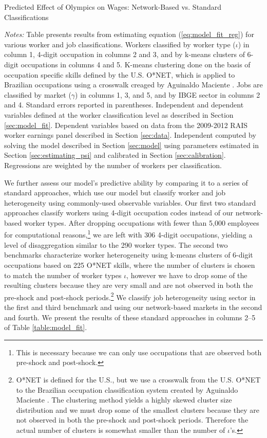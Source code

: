 \documentclass[12pt]{article}
\def\g{\gamma}
\def\i{\iota}
\theoremstyle{definition}
\theoremstyle{plain}
\begin{document}
\begin{table}[h!] \centering
	\caption{Predicted Effect of Olympics on Wages: Network-Based vs. Standard Classifications}
	
	\label{table:model_fit}
	\flushleft\footnotesize \emph{Notes:} Table presents results from estimating equation (\ref{eq:model_fit_reg}) for various worker and job classifications. Workers classified by worker type ($\i$) in column 1, 4-digit occupation in columns 2 and 3, and by k-means clusters of 6-digit occupations in columns 4 and 5. K-means clustering done on the basis of occupation specific skills defined by the U.S. O*NET, which is applied to Brazilian occupations using a crosswalk creaged by Aguinaldo Maciente \citep{Maciente2013}. Jobs are classified by market ($\g$) in columns 1, 3, and 5, and by IBGE sector in columns 2 and 4. Standard errors reported in parentheses. Independent and dependent variables defined at the worker classification level as described in Section \ref{sec:model_fit}. Dependent variables based on data from the 2009-2012 RAIS worker earnings panel described in Section \ref{sec:data}. Independent computed by solving the model described in Section \ref{sec:model} using parameters estimated in Section \ref{sec:estimating_psi} and calibrated in Section \ref{sec:calibration}. Regressions are weighted by the number of workers per classification.
\end{table}




We further assess our model's predictive ability by comparing it to a series of standard approaches, which use our model but classify worker and job heterogeneity using commonly-used observable variables. Our first two standard approaches classify workers using 4-digit occupation codes instead of our network-based worker types. After dropping occupations with fewer than 5,000 employees for computational reasons,\footnote{This is necessary because we can only use occupations that are observed both pre-shock and post-shock. }  we are left with 306 4-digit occupations, yielding a level of disaggregation similar to the 290 worker types. The second two benchmarks characterize worker heterogeneity using k-means clusters of 6-digit occupations based on 225 O*NET skills, where the number of clusters is chosen to match the number of worker types $\i$, however we have to drop some of the resulting clusters because they are very small and are not observed in both the pre-shock and post-shock periods.\footnote{O*NET is defined for the U.S., but we use a crosswalk from the U.S. O*NET to the Brazilian occupation classification system created by Aguinaldo Maciente \citep{Maciente2013}. The clustering method yields a highly skewed cluster size distribution and we must drop some of the smallest clusters because they are not observed in both the pre-shock and post-shock periods. Therefore the actual number of clusters is somewhat smaller than the number of $\i$'s.} We classify job heterogeneity using sector in the first and third benchmark and using our network-based markets in the second and fourth. We present the results of these standard approaches in columns 2--5 of Table \ref{table:model_fit}.
\end{document}
